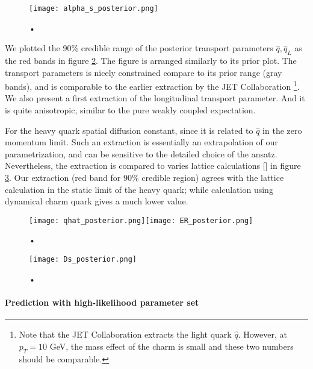 \begin{figure}
\centering
\texttt{[image: alpha\_s\_posterior.png]}
\caption{•}
\label{fig:new:posterior-alphas}
\end{figure}

We plotted the 90\% credible range of the posterior transport parameters $\hat{q}, \hat{q}_L$ as the red bands in figure \ref{fig:new:posterior-qhat}.
The figure is arranged similarly to its prior plot.
The transport parameters is nicely constrained compare to its prior range (gray bands), and is comparable to the earlier extraction by the JET Collaboration \footnote{Note that the JET Collaboration extracts the light quark $\hat{q}$. However, at $p_T = 10$ GeV, the mass effect of the charm is small and these two numbers should be comparable.}.
We also present a first extraction of the longitudinal transport parameter. 
And it is quite anisotropic, similar to the pure weakly coupled expectation.

For the heavy quark spatial diffusion constant, since it is related to $\hat{q}$ in the zero momentum limit. 
Such an extraction is essentially an extrapolation of our parametrization, and can be sensitive to the detailed choice of the ansatz. 
Nevertheless, the extraction is compared to varies lattice calculations [] in  figure \ref{fig:new:posterior-Ds}.
Our extraction (red band for 90\% credible region) agrees with the lattice calculation in the static limit of the heavy quark; while calculation using dynamical charm quark gives a much lower value.


\begin{figure}
\centering
\texttt{[image: qhat\_posterior.png]}\texttt{[image: ER\_posterior.png]}
\caption{•}
\label{fig:new:posterior-qhat}
\end{figure}


\begin{figure}
\centering
\texttt{[image: Ds\_posterior.png]}
\caption{•}
\label{fig:new:posterior-Ds}
\end{figure}

\paragraph{Prediction with high-likelihood parameter set}

